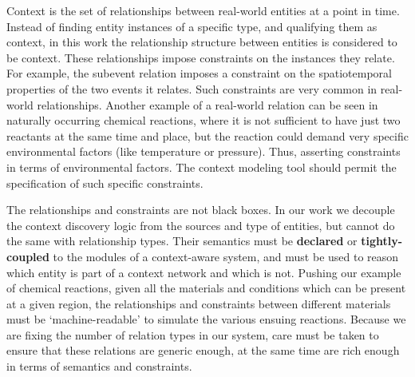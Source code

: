 
Context is the set of relationships between real-world entities at a point in time. Instead of finding entity instances of a specific type, and qualifying them as context, in this work the relationship structure between entities is considered to be  context. These relationships impose constraints on the instances they relate. For example, the subevent relation imposes a constraint on the spatiotemporal properties of the two events it relates. Such constraints are very common in real-world relationships. Another example of a real-world relation can be seen in naturally occurring chemical reactions, where it is not sufficient to have just two reactants at the same time and place, but the reaction could demand very specific environmental factors (like temperature or pressure). Thus, asserting constraints in terms of environmental factors. The context modeling tool should permit the specification of such specific constraints.

The relationships and constraints are not black boxes. In our work we decouple the context discovery logic from the sources and type of entities, but cannot do the same with relationship types. Their semantics must be \textbf{declared} or \textbf{tightly-coupled} to the modules of a context-aware system, and must be used to reason which entity is part of a context network and which is not. Pushing our example of chemical reactions, given all the materials and conditions which can be present at a given region, the relationships and constraints between different materials must be `machine-readable' to simulate the various ensuing reactions. Because we are fixing the number of relation types in our system, care must be taken to ensure that these relations are generic enough, at the same time are rich enough in terms of semantics and constraints.

